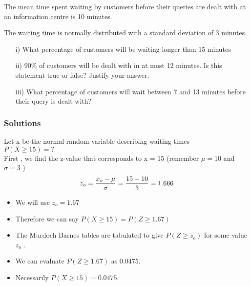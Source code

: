 \documentclass[a4]{beamer}
\begin{document}
\begin{frame}
The mean time spent waiting by customers before their queries are dealt with at an information centre is 10 minutes.

The waiting time is normally distributed with a standard deviation of 3 minutes.
\begin{itemize}
\item [i)] What percentage of customers will be waiting longer than 15 minutes

\item [ii)] $90\%$ of customers will be dealt with in at most 12 minutes. Is this statement true or false?
Justify your answer.

\item [iii)] What percentage of customers will wait between 7 and 13 minutes before their query is dealt with?
\end{itemize}
\end{frame}
\begin{frame}
\frametitle{Solutions}

Let x be the normal random variable describing waiting times\\
$P(X \geq 15) =?$ \\
\bigskip
     First , we find the z-value that corresponds to x = 15  (remember $\mu=10$ and $\sigma=3$  )\\
\[ z_o = { x_o - \mu \over \sigma }  = { 15 - 10 \over 3 } = 1.666 \]
\begin{itemize}
\item We will use $z_o =1.67$
\item Therefore we can say $P(X \geq 15 ) = P(Z \geq 1.67)$
\item The Murdoch Barnes tables are tabulated to give $P(Z \geq z_o)$ for some value $ z_o$ .
\item We can evaluate $P(Z \geq 1.67)$  as 0.0475.
\item Necessarily $P(X \geq 15) = 0.0475$.
\end{itemize}
\end{frame}
\end{document}
